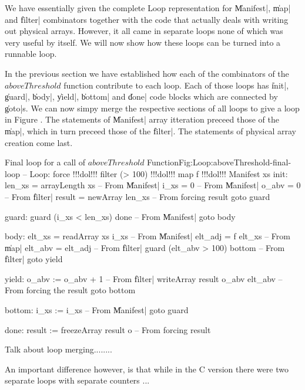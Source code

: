 \documentclass[preamble.tex]{subfiles}
\begin{document}
We have essentially given the complete Loop representation for \|Manifest|, \|map| and \|filter| combinators together with the code that actually deals with writing out physical arrays. However, it all came in separate loops none of which was very useful by itself. We will now show how these loops can be turned into a runnable loop.


In the previous section we have established how each of the combinators of the $aboveThreshold$ function contribute to each loop. Each of those loops has \|init|, \|guard|, \|body|, \|yield|, \|bottom| and \|done| code blocks which are connected by \|goto|s. We can now simpy merge the respective sections of all loops to give a loop in Figure . The statements of \|Manifest| array itteration preceed those of the \|map|, which in turn preceed those of the \|filter|. The statements of physical array creation come last.

\begin{loopcode2}{Final loop for a call of $aboveThreshold$ Function}{Fig:Loop:aboveThreshold-final-loop}
  -- Loop: force !!!dol!!! filter (> 100) !!!dol!!! map f !!!dol!!! Manifest xs
  init:
    len_xs = arrayLength xs          -- From \|Manifest|
    i_xs = 0                         -- From \|Manifest|
    o_abv = 0                        -- From \|filter|
    result = newArray len_xs         -- From forcing result
    goto guard

  guard:
    guard (i_xs < len_xs) done       -- From \|Manifest|
    goto body

  body:
    elt_xs = readArray xs i_xs       -- From \|Manifest|
    elt_adj = f elt_xs               -- From \|map|
    elt_abv = elt_adj                -- From \|filter|     
    guard (elt_abv > 100) bottom     -- From \|filter|
    goto yield

  yield:
    o_abv := o_abv + 1               -- From \|filter|
    writeArray result o_abv elt_abv  -- From forcing the result
    goto bottom

  bottom:
    i_xs := i_xs                     -- From \|Manifest|
    goto guard

  done:
    result := freezeArray result o   -- From forcing result

\end{loopcode2}

Talk about loop merging........

An important difference however, is that while in the C version there were two separate loops with separate counters ...
\end{document}

